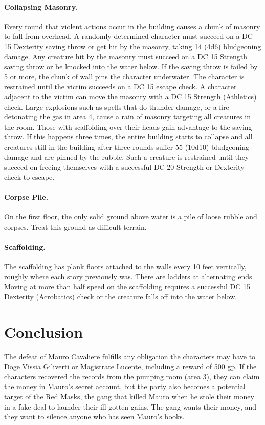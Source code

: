\documentclass[10pt,a4paper,twoside,twocolumn,openany,bg=print,nodeprecatedcode]{dndbook}
\begin{document}
\paragraph{Collapsing Masonry.}
Every round that violent actions occur in the building causes a chunk of masonry to fall from overhead. A randomly determined character must succeed on a DC 15 Dexterity saving throw or get hit by the masonry, taking 14 (4d6) bludgeoning damage. Any creature hit by the masonry must succeed on a DC 15 Strength saving throw or be knocked into the water below. If the saving throw is failed by 5 or more, the chunk of wall pins the character underwater. The character is restrained until the victim succeeds on a DC 15 escape check. A character adjacent to the victim can move the masonry with a DC 15 Strength (Athletics) check.
Large explosions such as spells that do thunder damage, or a fire detonating the gas in area 4, cause a rain of masonry targeting all creatures in the room. Those with scaffolding over their heads gain advantage to the saving throw. If this happens three times, the entire building starts to collapse and all creatures still in the building after three rounds suffer 55 (10d10) bludgeoning damage and are pinned by the rubble. Such a creature is restrained until they succeed on freeing themselves with a successful DC 20 Strength or Dexterity check to escape.
\paragraph{Corpse Pile.}
On the first floor, the only solid ground above water is a pile of loose rubble and corpses. Treat this ground as difficult terrain.
\paragraph{Scaffolding.}
The scaffolding has plank floors attached to the walls every 10 feet vertically, roughly where each story previously was. There are ladders at alternating ends. Moving at more than half speed on the scaffolding requires a successful DC 15 Dexterity (Acrobatics) check or the creature falls off into the water below.
\section{Conclusion}
The defeat of Mauro Cavaliere fulfills any obligation the characters may have to Doge Vissia Giliverti or Magistrate Lucente, including a reward of 500 gp.
If the characters recovered the records from the pumping room (area 3), they can claim the money in Mauro's secret account, but the party also becomes a potential target of the Red Masks, the gang that killed Mauro when he stole their money in a fake deal to launder their ill-gotten gains. The gang wants their money, and they want to silence anyone who has seen Mauro's books.
\end{document}

